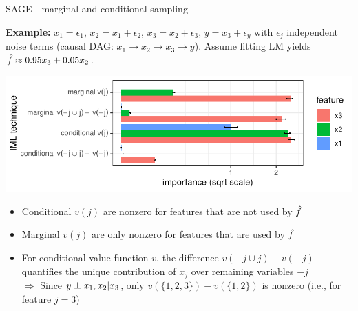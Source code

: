 \documentclass[11pt,compress,t,notes=noshow, aspectratio=169, xcolor=table]{beamer}
\begin{document}
\begin{frame}{SAGE - marginal and conditional sampling}

\textbf{Example:} $x_1 = \epsilon_1$, $x_2 = x_1 + \epsilon_2$, $x_3 = x_2 + \epsilon_3$, $y = x_3 + \epsilon_y$ with $\epsilon_j$ independent noise terms (causal DAG: $x_1 \rightarrow x_2 \rightarrow x_3 \rightarrow y$). Assume fitting LM yields $\fh \approx 0.95 x_3 + 0.05 x_2$. 
%
\centerline{\includegraphics[width=0.7\linewidth]{figure_man/sage_variants}}

\begin{itemize}
    \item Conditional $v(j)$ are nonzero for features that are not used by $\fh$
    \item Marginal $v(j)$ are only nonzero for features that are used by $\fh$
    \item For conditional value function $v$, the difference $v(-j \cup j) - v(-j)$ quantifies the unique contribution of $x_j$ over remaining variables $-j$\\
    $\Rightarrow$ Since $y \indep x_1, x_2 | x_3$, only $v(\{1,2,3\}) - v(\{1, 2\})$ is nonzero (i.e., for feature $j = 3$)
\end{itemize}

\end{frame}
\end{document}
